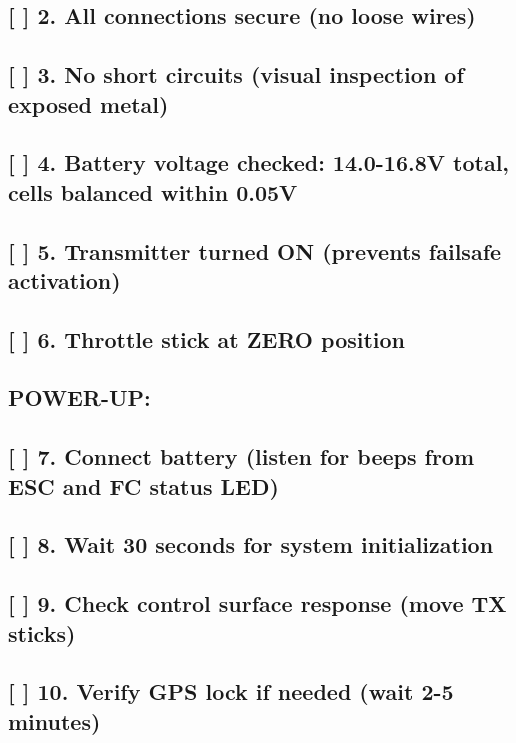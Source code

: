 \documentclass[11pt,letterpaper]{article}
\begin{document}
{{\subsection*{[ ] 2. All connections secure (no loose wires)}

\subsection*{[ ] 3. No short circuits (visual inspection of exposed metal)}

\subsection*{[ ] 4. Battery voltage checked: 14.0-16.8V total, cells balanced within 0.05V}

\subsection*{[ ] 5. Transmitter turned ON (prevents failsafe activation)}

\subsection*{[ ] 6. Throttle stick at ZERO position}

\subsection*{POWER-UP:}

\subsection*{[ ] 7. Connect battery (listen for beeps from ESC and FC status LED)}

\subsection*{[ ] 8. Wait 30 seconds for system initialization}

\subsection*{[ ] 9. Check control surface response (move TX sticks)}

\subsection*{[ ] 10. Verify GPS lock if needed (wait 2-5 minutes)}

}}
\end{document}
